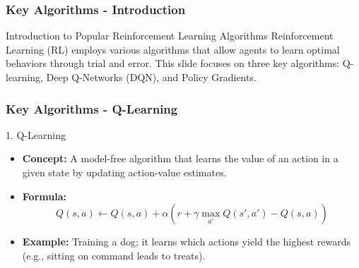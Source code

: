 \documentclass[aspectratio=169]{beamer}
\begin{document}
\begin{frame}[fragile]
    \frametitle{Key Algorithms - Introduction}
    \begin{block}{Introduction to Popular Reinforcement Learning Algorithms}
        Reinforcement Learning (RL) employs various algorithms that allow agents to learn optimal behaviors through trial and error. This slide focuses on three key algorithms: Q-learning, Deep Q-Networks (DQN), and Policy Gradients.
    \end{block}
\end{frame}

\begin{frame}[fragile]
    \frametitle{Key Algorithms - Q-Learning}
    \begin{block}{1. Q-Learning}
        \begin{itemize}
            \item \textbf{Concept:} A model-free algorithm that learns the value of an action in a given state by updating action-value estimates.
            \item \textbf{Formula:}
            \begin{equation}
                Q(s, a) \leftarrow Q(s, a) + \alpha \left( r + \gamma \max_{a'} Q(s', a') - Q(s, a) \right)
            \end{equation}
            \item \textbf{Example:} Training a dog; it learns which actions yield the highest rewards (e.g., sitting on command leads to treats).
        \end{itemize}
    \end{block}
\end{frame}
\end{document}
